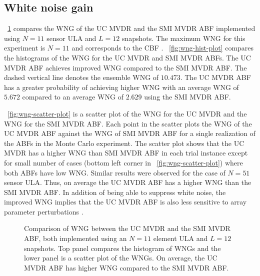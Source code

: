 \subsection{White noise gain}
\label{sec:ucmvdr-wng-result}
\figurename{}~\ref{fig:wng} compares the WNG of the UC MVDR and the
SMI MVDR ABF implemented using $N = 11$ sensor ULA and $L = 12$
snapshots. The maximum WNG for this experiment is $N = 11$ and
corresponds to the CBF
\cite{vtree2002oap}. \figurename{}~\ref{fig:wng-hist-plot} compares
the histograms of the WNG for the UC MVDR and SMI MVDR ABFs. The UC
MVDR ABF achieves improved WNG compared to the SMI MVDR ABF. The
dashed vertical line denotes the ensemble WNG of $10.473$. The UC MVDR
ABF has a greater probability of achieving higher WNG with an average
WNG of $5.672$ compared to an average WNG of $2.629$ using the SMI
MVDR ABF.

\figurename{}~\ref{fig:wng-scatter-plot} is a scatter plot of the WNG
for the UC MVDR and the WNG for the SMI MVDR ABF. Each point in the
scatter plots the WNG of the UC MVDR ABF against the WNG of SMI MVDR
ABF for a single realization of the ABFs in the Monte Carlo
experiment. The scatter plot shows that the UC MVDR has a higher WNG
than SMI MVDR ABF in each trial instance except for small number of
cases (bottom left corner in \figurename{}~\ref{fig:wng-scatter-plot})
where both ABFs have low WNG. Similar results were observed for the
case of $N = 51$ sensor ULA. Thus, on average the UC MVDR ABF has a
higher WNG than the SMI MVDR ABF. In addition of being able to
suppress white noise, the improved WNG implies that the UC MVDR ABF is
also less sensitive to array parameter perturbations
\cite{Gilbert1955,vtree2002oap}.


\begin{figure}[!hp]
  \centering

  \caption{Comparison of WNG between the UC MVDR and the SMI MVDR ABF,
    both implemented using an $N = 11$ element ULA and $L = 12$
    snapshots. Top panel compares the histogram of WNGs and the lower
    panel is a scatter plot of the WNGs. On average, the UC MVDR ABF
    has higher WNG compared to the SMI MVDR ABF. }
  \label{fig:wng}
\end{figure}

